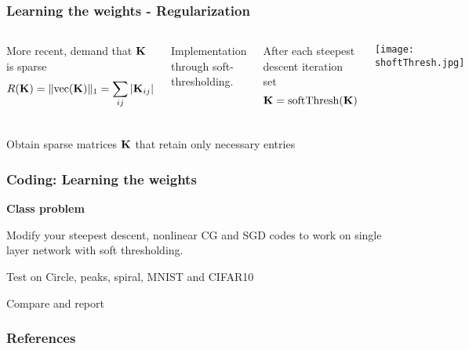 \documentclass[12pt,fleqn]{beamer}
\begin{document}
\begin{frame}[fragile]\frametitle{Learning the weights - Regularization}

\begin{columns}
More recent, demand that ${\bf K}$ is sparse
$$ R({\bf K}) = \|{\rm vec}({\bf K})\|_1 = \sum_{ij} |{\bf K}_{ij}| $$

\bigskip

Implementation through soft-thresholding.


After each steepest descent iteration set
$$ {\bf K} = {\rm softThresh}({\bf K}) $$
	
	\begin{center}
	\texttt{[image: shoftThresh.jpg]}
	\end{center}
	
\end{columns}

\vspace{10mm}
\begin{center}
Obtain sparse matrices ${\bf K}$ that retain only necessary entries
	
\end{center}

\end{frame}




\begin{frame}[fragile]\frametitle{Coding: Learning the weights }

{\bf Class problem}

\bigskip

Modify your steepest descent, nonlinear CG and SGD codes to work on single layer
network with soft thresholding.

Test on Circle, peaks, spiral, MNIST and CIFAR10

Compare and report

\end{frame}


%
%
%
%

\begin{frame}[allowframebreaks]
	\frametitle{References}



\end{frame}
\end{document}
